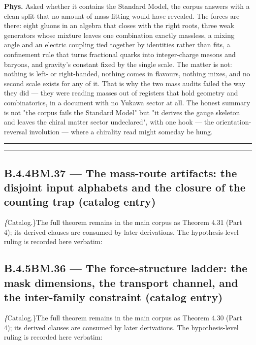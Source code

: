 \documentclass[11pt,openany]{report}
\theoremstyle{canonplain}
\theoremstyle{canondef}
\begin{document}
\textbf{Phys.} Asked whether it contains the Standard Model, the corpus answers with a clean split that no amount of mass-fitting would have revealed. The forces are there: eight gluons in an algebra that closes with the right roots, three weak generators whose mixture leaves one combination exactly massless, a mixing angle and an electric coupling tied together by identities rather than fits, a confinement rule that turns fractional quarks into integer-charge mesons and baryons, and gravity's constant fixed by the single scale. The matter is not: nothing is left- or right-handed, nothing comes in flavours, nothing mixes, and no second scale exists for any of it. That is why the two mass audits failed the way they did — they were reading masses out of registers that hold geometry and combinatorics, in a document with no Yukawa sector at all. The honest summary is not "the corpus fails the Standard Model" but "it derives the gauge skeleton and leaves the chiral matter sector undeclared", with one hook — the orientation-reversal involution — where a chirality read might someday be hung.

\vspace{2pt}\noindent\rule{\textwidth}{0.4pt}\vspace{2pt}

\vspace{2pt}\noindent\rule{\textwidth}{0.4pt}\vspace{2pt}

\medskip
\subsection*{\texorpdfstring{B.4.4\quad BM.37 — The mass-route artifacts: the disjoint input alphabets and the closure of the counting trap (catalog entry)}{BM.37 B.4.4}}
\label{tag:BM-37-cat}
{\small \textit\{Catalog.\}\quad The full theorem remains in the main corpus as Theorem 4.31 (Part 4); its derived clauses are consumed by later derivations. The hypothesis-level ruling is recorded here verbatim:}
\begin{quote}\small \end{quote}
\medskip
\subsection*{\texorpdfstring{B.4.5\quad BM.36 — The force-structure ladder: the mask dimensions, the transport channel, and the inter-family constraint (catalog entry)}{BM.36 B.4.5}}
\label{tag:BM-36-cat}
{\small \textit\{Catalog.\}\quad The full theorem remains in the main corpus as Theorem 4.30 (Part 4); its derived clauses are consumed by later derivations. The hypothesis-level ruling is recorded here verbatim:}
\begin{quote}\small \end{quote}
\medskip
\end{document}
